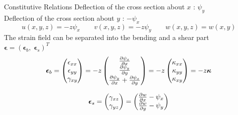\documentclass{beamer}
\begin{document}
\begin{frame}{Constitutive Relations}
Deflection of the cross section about $x$ : $\psi_y$  \\
Deflection of the cross section about $y$ : $-\psi_x$  
\begin{equation*}
u(x,y,z) = -z \psi_x \qquad v(x,y,z) = -z \psi_y \qquad 
w(x,y,z) = w(x,y)
\end{equation*}
The strain field can be separated into the bending and a shear part $\bm{\epsilon} = \left(\bm{\epsilon}_b, \; \bm{\epsilon}_s \right)^T$
\begin{equation*}
\bm{\epsilon}_b = 
\begin{pmatrix}
\epsilon_{xx} \\
\epsilon_{yy} \\
\gamma_{xy} \\
\end{pmatrix} = -z
\begin{pmatrix}
\diffp{\psi_x}{x} \\
\diffp{\psi_y}{y} \\
\diffp{\psi_y}{x} + \diffp{\psi_x}{y} \\
\end{pmatrix} = -z
\begin{pmatrix}
\kappa_{xx} \\
\kappa_{yy} \\
\kappa_{xy} \\
\end{pmatrix} = -z \bm{\kappa}
\end{equation*}

\begin{equation*}	
\bm{\epsilon}_s = 
\begin{pmatrix}
\gamma_{xz} \\
\gamma_{yz} \\
\end{pmatrix} = 
\begin{pmatrix}
\diffp{w}{x} - \psi_x \\
\diffp{w}{y} - \psi_y \\
\end{pmatrix}
\end{equation*}

\end{frame}
\end{document}

